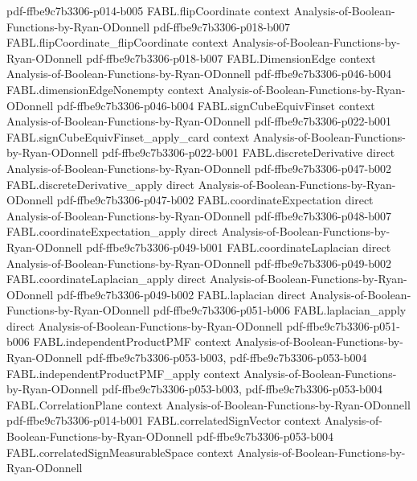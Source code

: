 \begin{theorem}
  {pdf-ffbe9c7b3306-p014-b005}
\proofstep
  {FABL.flipCoordinate}
  {context}
  {Analysis-of-Boolean-Functions-by-Ryan-ODonnell}
  {pdf-ffbe9c7b3306-p018-b007}
\proofstep
  {FABL.flipCoordinate_flipCoordinate}
  {context}
  {Analysis-of-Boolean-Functions-by-Ryan-ODonnell}
  {pdf-ffbe9c7b3306-p018-b007}
\proofstep
  {FABL.DimensionEdge}
  {context}
  {Analysis-of-Boolean-Functions-by-Ryan-ODonnell}
  {pdf-ffbe9c7b3306-p046-b004}
\proofstep
  {FABL.dimensionEdgeNonempty}
  {context}
  {Analysis-of-Boolean-Functions-by-Ryan-ODonnell}
  {pdf-ffbe9c7b3306-p046-b004}
\proofstep
  {FABL.signCubeEquivFinset}
  {context}
  {Analysis-of-Boolean-Functions-by-Ryan-ODonnell}
  {pdf-ffbe9c7b3306-p022-b001}
\proofstep
  {FABL.signCubeEquivFinset_apply_card}
  {context}
  {Analysis-of-Boolean-Functions-by-Ryan-ODonnell}
  {pdf-ffbe9c7b3306-p022-b001}
\proofstep
  {FABL.discreteDerivative}
  {direct}
  {Analysis-of-Boolean-Functions-by-Ryan-ODonnell}
  {pdf-ffbe9c7b3306-p047-b002}
\proofstep
  {FABL.discreteDerivative_apply}
  {direct}
  {Analysis-of-Boolean-Functions-by-Ryan-ODonnell}
  {pdf-ffbe9c7b3306-p047-b002}
\proofstep
  {FABL.coordinateExpectation}
  {direct}
  {Analysis-of-Boolean-Functions-by-Ryan-ODonnell}
  {pdf-ffbe9c7b3306-p048-b007}
\proofstep
  {FABL.coordinateExpectation_apply}
  {direct}
  {Analysis-of-Boolean-Functions-by-Ryan-ODonnell}
  {pdf-ffbe9c7b3306-p049-b001}
\proofstep
  {FABL.coordinateLaplacian}
  {direct}
  {Analysis-of-Boolean-Functions-by-Ryan-ODonnell}
  {pdf-ffbe9c7b3306-p049-b002}
\proofstep
  {FABL.coordinateLaplacian_apply}
  {direct}
  {Analysis-of-Boolean-Functions-by-Ryan-ODonnell}
  {pdf-ffbe9c7b3306-p049-b002}
\proofstep
  {FABL.laplacian}
  {direct}
  {Analysis-of-Boolean-Functions-by-Ryan-ODonnell}
  {pdf-ffbe9c7b3306-p051-b006}
\proofstep
  {FABL.laplacian_apply}
  {direct}
  {Analysis-of-Boolean-Functions-by-Ryan-ODonnell}
  {pdf-ffbe9c7b3306-p051-b006}
\proofstep
  {FABL.independentProductPMF}
  {context}
  {Analysis-of-Boolean-Functions-by-Ryan-ODonnell}
  {pdf-ffbe9c7b3306-p053-b003,
    pdf-ffbe9c7b3306-p053-b004}
\proofstep
  {FABL.independentProductPMF_apply}
  {context}
  {Analysis-of-Boolean-Functions-by-Ryan-ODonnell}
  {pdf-ffbe9c7b3306-p053-b003,
    pdf-ffbe9c7b3306-p053-b004}
\proofstep
  {FABL.CorrelationPlane}
  {context}
  {Analysis-of-Boolean-Functions-by-Ryan-ODonnell}
  {pdf-ffbe9c7b3306-p014-b001}
\proofstep
  {FABL.correlatedSignVector}
  {context}
  {Analysis-of-Boolean-Functions-by-Ryan-ODonnell}
  {pdf-ffbe9c7b3306-p053-b004}
\proofstep
  {FABL.correlatedSignMeasurableSpace}
  {context}
  {Analysis-of-Boolean-Functions-by-Ryan-ODonnell}

\end{theorem}
